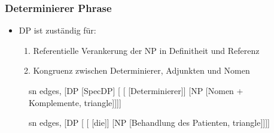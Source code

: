 \begin{frame}
\frametitle{Determinierer Phrase}

	\begin{itemize}
		\item DP ist zuständig für:
		\begin{enumerate}
			\item Referentielle Verankerung der NP in Definitheit und Referenz
			\item Kongruenz zwischen Determinierer, Adjunkten und Nomen
		\end{enumerate}				
	\end{itemize}


\begin{figure}[b]
  	\begin{minipage}[b]{0.45\textwidth}
	\centering
	\footnotesize{
		\begin{forest}
		sn edges,
		[DP [SpecDP]
			[ 	[ [Determinierer]]
						[NP [Nomen + Komplemente, triangle]]]]
		\end{forest}
		}
  	\end{minipage}  
 	\pause            
	\begin{minipage}[b]{0.45\textwidth}
	\centering
	\footnotesize{
		\begin{forest}
		sn edges,
		[DP [ 	[ [die]]
						[NP [Behandlung des Patienten, triangle]]]]
		\end{forest}
		}
  	\end{minipage}  
\end{figure}

\end{frame}


